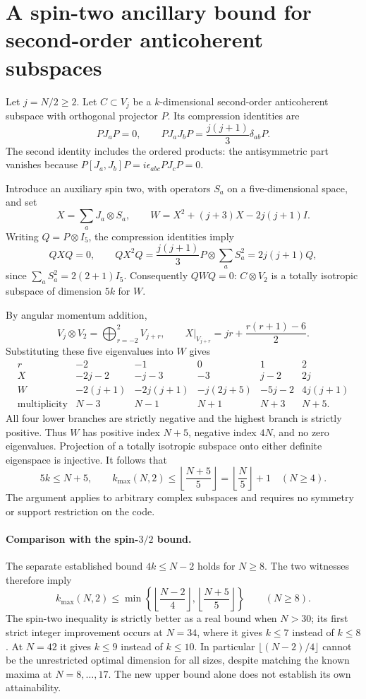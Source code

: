 \documentclass[11pt]{article}
\begin{document}
\section*{A spin-two ancillary bound for second-order anticoherent subspaces}
Let $j=N/2\ge2$. Let $C\subset V_j$ be a $k$-dimensional second-order
anticoherent subspace with orthogonal projector $P$. Its compression
identities are
\[
 PJ_aP=0,\qquad PJ_aJ_bP=\frac{j(j+1)}3\delta_{ab}P.
\]
The second identity includes the ordered products: the antisymmetric part
vanishes because $P[J_a,J_b]P=i\epsilon_{abc}PJ_cP=0$.

Introduce an auxiliary spin two, with operators $S_a$ on a five-dimensional
space, and set
\[
 X=\sum_aJ_a\otimes S_a,\qquad
 W=X^2+(j+3)X-2j(j+1)I.
\]
Writing $Q=P\otimes I_5$, the compression identities imply
\[
 QXQ=0,\qquad
 QX^2Q=\frac{j(j+1)}3P\otimes\sum_aS_a^2
       =2j(j+1)Q,
\]
since $\sum_aS_a^2=2(2+1)I_5$. Consequently $QWQ=0$:
$C\otimes V_2$ is a totally isotropic subspace of dimension $5k$ for $W$.

By angular momentum addition,
\[
 V_j\otimes V_2=\bigoplus_{r=-2}^2 V_{j+r},\qquad
 X|_{V_{j+r}}=jr+\frac{r(r+1)-6}{2}.
\]
Substituting these five eigenvalues into $W$ gives
\[
\begin{array}{c|ccccc}
 r&-2&-1&0&1&2\\ \hline
 X&-2j-2&-j-3&-3&j-2&2j\\
 W&-2(j+1)&-2j(j+1)&-j(2j+5)&-5j-2&4j(j+1)\\
 \text{multiplicity}&N-3&N-1&N+1&N+3&N+5.
\end{array}
\]
All four lower branches are strictly negative and the highest branch is
strictly positive. Thus $W$ has positive index $N+5$, negative index $4N$,
and no zero eigenvalues. Projection of a totally isotropic subspace onto
either definite eigenspace is injective. It follows that
\[
 \boxed{\quad5k\le N+5,\qquad
 k_{\max}(N,2)\le\left\lfloor\frac{N+5}{5}\right\rfloor
 =\left\lfloor\frac N5\right\rfloor+1\quad(N\ge4).\quad}
\]
The argument applies to arbitrary complex subspaces and requires no
symmetry or support restriction on the code.

\paragraph{Comparison with the spin-$3/2$ bound.}
The separate established bound $4k\le N-2$ holds for $N\ge8$.
The two witnesses therefore imply
\[
 k_{\max}(N,2)\le
 \min\!\left\{\left\lfloor\frac{N-2}{4}\right\rfloor,
                 \left\lfloor\frac{N+5}{5}\right\rfloor\right\}
 \qquad(N\ge8).
\]
The spin-two inequality is strictly better as a real bound when $N>30$;
its first strict integer improvement occurs at $N=34$, where it gives
$k\le7$ instead of $k\le8$. At $N=42$ it gives $k\le9$ instead of $k\le10$.
In particular $\lfloor(N-2)/4\rfloor$ cannot be the unrestricted optimal
dimension for all sizes, despite matching the known maxima at $N=8,\ldots,17$.
The new upper bound alone does not establish its own attainability.
\end{document}
